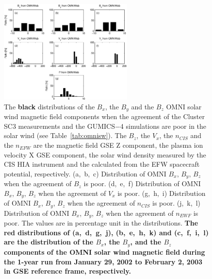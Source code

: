 \documentclass[linenumbers,draft]{agujournal}
\begin{document}
\begin{figure}[h]
\centering
\includegraphics[width=0.6\textwidth,angle=0]{swe-2020-corr-f13}  
\caption{The \textbf{black} distributions of the $B_{x}$, the $B_{y}$  and the $B_{z}$ OMNI solar wind magnetic field components when the agreement of the Cluster SC3 measurements and the GUMICS$-$4 simulations are poor in the solar wind (see Table~\ref{tab:omnisw}). The $B_{z}$, the $V_{x}$, the $n_{CIS}$ and the $n_{EFW}$ are the magnetic field GSE Z component, the plasma ion velocity X GSE component, the  solar wind density measured by the CIS HIA instrument and the calculated from the EFW spacecraft potential, respectively. (a,~b,~c) Distribution of OMNI $B_{x}$, $B_{y}$, $B_{z}$ when the agreement of $B_{z}$ is poor. (d,~e,~f) Distribution of OMNI  $B_{x}$, $B_{y}$, $B_{z}$ when the agreement of $V_{x}$ is poor. (g,~h,~i) Distribution of OMNI $B_{x}$, $B_{y}$, $B_{z}$ when the agreement of $n_{CIS}$ is poor. (j,~k,~l) Distribution of OMNI $B_{x}$, $B_{y}$, $B_{z}$ when the agreement of $n_{EWF}$ is poor. The values are in percentage unit in the distributions. \textbf{The red distributions of (a,~d,~g,~j), (b,~e,~h,~k) and (c,~f,~i,~l) are the distribution of the $B_{x}$, the $B_{y}$, and the $B_{z}$ components of the OMNI solar wind magnetic field during the 1-year run from January 29, 2002 to February 2, 2003 in GSE reference frame, respectively.}} 
\label{fig:swomnibxyz}
\end{figure}

\pagebreak
\end{document}
